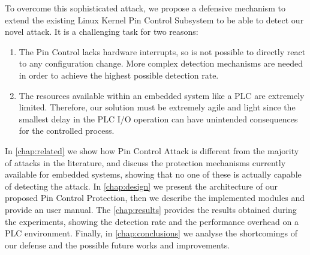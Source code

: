 To overcome this sophisticated attack, we propose a defensive mechanism to extend the existing Linux Kernel Pin Control Subsystem to be able to detect our novel attack.
It is a challenging task for two reasons:
\begin{enumerate}
	\item The Pin Control lacks hardware interrupts, so is not possible to directly react to any configuration change. More complex detection mechanisms are needed
		in order to achieve the highest possible detection rate.
	\item The resources available within an embedded system like a PLC are extremely limited. Therefore, our solution must be extremely agile and light
		since the smallest delay in the PLC I/O operation can have unintended consequences for the controlled process.
\end{enumerate}

In \chap \ref{chap:related} we show how Pin Control Attack is different from the majority of attacks in the literature, and discuss the protection mechanisms currently available
for embedded systems, showing that no one of these is actually capable of detecting the attack.
In \chap \ref{chap:design} we present the architecture of our proposed Pin Control Protection, then we describe the implemented modules and provide an user manual.
The \chap \ref{chap:results} provides the results obtained during the experiments, showing the detection rate and the performance overhead on a PLC environment.
Finally, in \chap \ref{chap:conclusions} we analyse the shortcomings of our defense and the possible future works and improvements.
